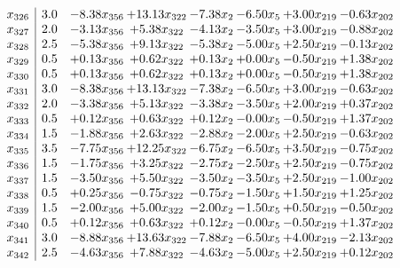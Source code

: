 \documentclass[8pt]{article}
\begin{document}
\[\begin{array}{c| c c@{\hskip 2pt} c@{\hskip 2pt} c@{\hskip 2pt} c@{\hskip 2pt} c@{\hskip 2pt} c@{\hskip 2pt} }
 x_{326}   &  3.0 & -8.38 x_{356} & + 13.13 x_{322} & -7.38 x_{2} & -6.50 x_{5} & +  3.00 x_{219} & -0.63 x_{202}\\
 x_{327}   &  2.0 & -3.13 x_{356} & +  5.38 x_{322} & -4.13 x_{2} & -3.50 x_{5} & +  3.00 x_{219} & -0.88 x_{202}\\
 x_{328}   &  2.5 & -5.38 x_{356} & +  9.13 x_{322} & -5.38 x_{2} & -5.00 x_{5} & +  2.50 x_{219} & -0.13 x_{202}\\
 x_{329}   &  0.5 & +  0.13 x_{356} & +  0.62 x_{322} & +  0.13 x_{2} & +  0.00 x_{5} & -0.50 x_{219} & +  1.38 x_{202}\\
 x_{330}   &  0.5 & +  0.13 x_{356} & +  0.62 x_{322} & +  0.13 x_{2} & +  0.00 x_{5} & -0.50 x_{219} & +  1.38 x_{202}\\
 x_{331}   &  3.0 & -8.38 x_{356} & + 13.13 x_{322} & -7.38 x_{2} & -6.50 x_{5} & +  3.00 x_{219} & -0.63 x_{202}\\
 x_{332}   &  2.0 & -3.38 x_{356} & +  5.13 x_{322} & -3.38 x_{2} & -3.50 x_{5} & +  2.00 x_{219} & +  0.37 x_{202}\\
 x_{333}   &  0.5 & +  0.12 x_{356} & +  0.63 x_{322} & +  0.12 x_{2} & -0.00 x_{5} & -0.50 x_{219} & +  1.37 x_{202}\\
 x_{334}   &  1.5 & -1.88 x_{356} & +  2.63 x_{322} & -2.88 x_{2} & -2.00 x_{5} & +  2.50 x_{219} & -0.63 x_{202}\\
 x_{335}   &  3.5 & -7.75 x_{356} & + 12.25 x_{322} & -6.75 x_{2} & -6.50 x_{5} & +  3.50 x_{219} & -0.75 x_{202}\\
 x_{336}   &  1.5 & -1.75 x_{356} & +  3.25 x_{322} & -2.75 x_{2} & -2.50 x_{5} & +  2.50 x_{219} & -0.75 x_{202}\\
 x_{337}   &  1.5 & -3.50 x_{356} & +  5.50 x_{322} & -3.50 x_{2} & -3.50 x_{5} & +  2.50 x_{219} & -1.00 x_{202}\\
 x_{338}   &  0.5 & +  0.25 x_{356} & -0.75 x_{322} & -0.75 x_{2} & -1.50 x_{5} & +  1.50 x_{219} & +  1.25 x_{202}\\
 x_{339}   &  1.5 & -2.00 x_{356} & +  5.00 x_{322} & -2.00 x_{2} & -1.50 x_{5} & +  0.50 x_{219} & -0.50 x_{202}\\
 x_{340}   &  0.5 & +  0.12 x_{356} & +  0.63 x_{322} & +  0.12 x_{2} & -0.00 x_{5} & -0.50 x_{219} & +  1.37 x_{202}\\
 x_{341}   &  3.0 & -8.88 x_{356} & + 13.63 x_{322} & -7.88 x_{2} & -6.50 x_{5} & +  4.00 x_{219} & -2.13 x_{202}\\
 x_{342}   &  2.5 & -4.63 x_{356} & +  7.88 x_{322} & -4.63 x_{2} & -5.00 x_{5} & +  2.50 x_{219} & +  0.12 x_{202}\\

\end{array}\]
\end{document}
